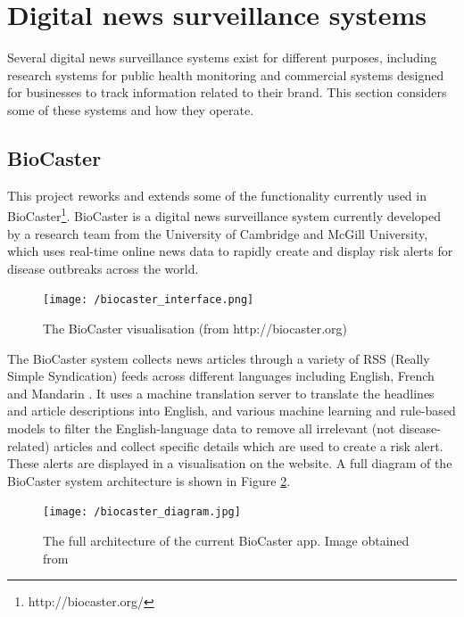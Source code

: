 \documentclass{l4proj}
\begin{document}
\section{Digital news surveillance systems}

Several digital news surveillance systems exist for different purposes, including research systems for public health monitoring and commercial systems designed for businesses to track information related to their brand. This section considers some of these systems and how they operate.

\subsection{BioCaster}
This project reworks and extends some of the functionality currently used in BioCaster\footnote{http://biocaster.org/}. BioCaster is a digital news surveillance system currently developed by a research team from the University of Cambridge and McGill University, which uses real-time online news data to rapidly create and display risk alerts for disease outbreaks across the world. \par
\begin{figure}[h]
\texttt{[image: /biocaster\_interface.png]}
\caption{The BioCaster visualisation (from http://biocaster.org)}
\label{fig:biocaster_visualisation}
\end{figure}
 The BioCaster system collects news articles through a variety of RSS (Really Simple Syndication) feeds across different languages including English, French and Mandarin \citep{collier2008biocaster}. It uses a machine translation server to translate the headlines and article descriptions into English, and various machine learning and rule-based models to filter the English-language data to remove all irrelevant (not disease-related) articles and collect specific details which are used to create a risk alert. These alerts are displayed in a visualisation on the website. A full diagram of the BioCaster system architecture is shown in Figure \ref{fig:biocaster_architecture}. 
 \begin{figure}[h]
 \centering
\texttt{[image: /biocaster\_diagram.jpg]}
\caption{The full architecture of the current BioCaster app. Image obtained from \cite{meng2022biocaster}}
\label{fig:biocaster_architecture}
\end{figure}
\par
\end{document}
